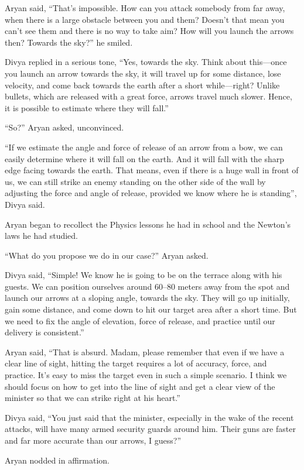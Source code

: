 Aryan said, “That's impossible. How can you attack somebody from far away, when
there is a large obstacle between you and them? Doesn't that mean you can't
see them and there is no way to take aim? How will you launch the arrows then?
Towards the sky?” he smiled.

Divya replied in a serious tone, “Yes, towards the sky. Think about this—once
you launch an arrow towards the sky, it will travel up for some distance, lose
velocity, and come back towards the earth after a short while—right? Unlike
bullets, which are released with a great force, arrows travel much slower. Hence,
it is possible to estimate where they will fall.”

“So?” Aryan asked, unconvinced.

“If we estimate the angle and force of release of an arrow from a bow, we can
easily determine where it will fall on the earth. And it will fall
with the sharp edge facing towards the earth. That means, even if there is a
huge wall in front of us, we can still strike an enemy standing on the other
side of the wall by adjusting the force and angle of release, provided we know
where he is standing”, Divya said.

Aryan began to recollect the Physics lessons he had in school and the Newton's
laws he had studied.

“What do you propose we do in our case?” Aryan asked.

Divya said, “Simple! We know he is going to be on the terrace along with his
guests. We can position ourselves around 60–80 meters away from the spot and
launch our arrows at a sloping angle, towards the sky. They will go up
initially, gain some distance, and come down to hit our target area after a
short time. But we need to fix the angle of elevation, force of release, and
practice until our delivery is consistent.”

Aryan said, “That is absurd. Madam, please remember that even if we have a clear
line of sight, hitting the target requires a lot of accuracy, force, and
practice. It's easy to miss the target even in such a simple scenario. I think
we should focus on how to get into the line of sight and get a clear view of the
minister so that we can strike right at his heart.”

Divya said, “You just said that the minister, especially in the wake of the
recent attacks, will have many armed security guards around him. Their guns
are faster and far more accurate than our arrows, I guess?”

Aryan nodded in affirmation.

